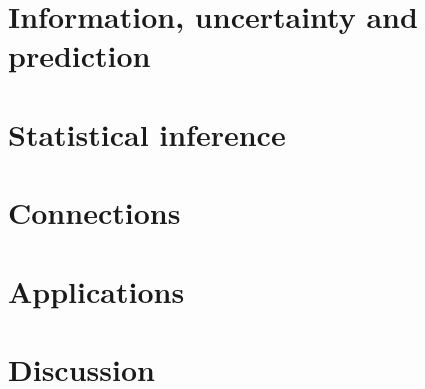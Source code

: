\documentclass[12pt]{article}
\begin{document}
\section{Information, uncertainty and prediction}\label{sec:gen_class}

\section{Statistical inference}\label{sec:inference}

\section{Connections}\label{sec:connections}

\section{Applications}\label{sec:applications}

\section{Discussion}\label{sec:discussion}
\end{document}
